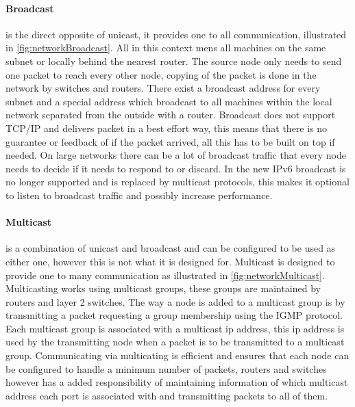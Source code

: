 \paragraph{Broadcast} is the direct opposite of unicast, it provides one to all communication, illustrated in \cref{fig:networkBroadcast}. All in this context mens all machines on the same subnet or locally behind the nearest router.
The source node only needs to send one packet to reach every other node, copying of the packet is done in the network by switches and routers.
There exist a broadcast address for every subnet and a special address which broadcast to all machines within the local network separated from the outside with a router.
Broadcast does not support TCP/IP and delivers packet in a best effort way, this means that there is no guarantee or feedback of if the packet arrived, all this has to be built on top if needed.
On large networks there can be a lot of broadcast traffic that every node needs to decide if it needs to respond to or discard.
In the new IPv6 broadcast is no longer supported \cite{RFC4291_AddressingIPv6Draft} and is replaced by multicast protocols, this makes it optional to listen to broadcast traffic and possibly increase performance.

\paragraph{Multicast} is a combination of unicast and broadcast and can be configured to be used as either one, however this is not what it is designed for. Multicast is designed to provide one to many communication as illustrated in \cref{fig:networkMulticast}.
Multicasting works using multicast groups, these groups are maintained by routers and layer 2 switches. The way a node is added to a multicast group is by transmitting a packet requesting a group membership using the IGMP protocol. Each multicast group is associated with a multicast ip address, this ip address is used by the transmitting node when a packet is to be transmitted to a multicast group.
Communicating via multicating is efficient and ensures that each node can be configured to handle a minimum number of packets, routers and switches however has a added responsibility of maintaining information of which multicast address each port is associated with and transmitting packets to all of them.

